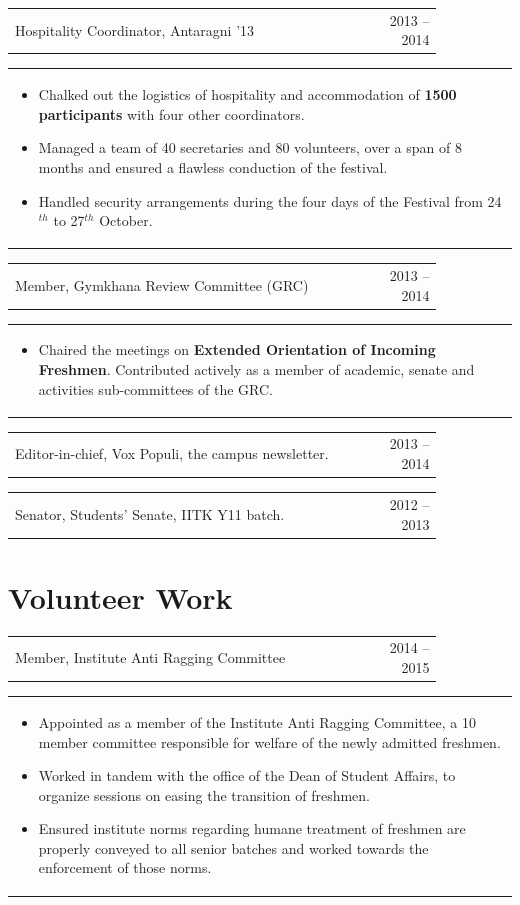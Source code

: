 \documentclass[a4paper]{article} %
\newcommand{\iproject}[3]{
    \begin{tabular}{p{0.85\linewidth}r}
        \textcolor{NavyBlue}{\small #2} & \multicolumn{1}{m{3cm}}{\raggedleft \small {\textsc{#1}}}\\
    \end{tabular}
    \begin{tabular}{p{\linewidth}}
    \vspace{-0.3cm}
        \footnotesize{#3}
    \end{tabular}
    \vspace{-0.6cm}
}
\newcommand{\skill}[2]{
    \begin{tabular}{p{0.85\linewidth}r}
        \small {#2} & \multicolumn{1}{m{3cm}}{\raggedleft \textsc{\small #1}}\\
    \end{tabular}
    \vspace{-0.5cm}
}
\begin{document}
\iproject {2013 -- 2014}
          {Hospitality Coordinator, Antaragni '13}
          {
               \begin{itemize}[leftmargin=0.5cm]
                   \item Chalked out the logistics of hospitality and accommodation of \textbf{1500 participants}
                       with four other coordinators.
                   \item Managed a team of 40 secretaries and 80 volunteers, over a span of 8 months and ensured a
                       flawless conduction of the festival.
                   \item Handled security arrangements during the four days of the Festival from 24$^{th}$ to 27$^{th}$ October.
               \end{itemize}
          }

\iproject {2013 -- 2014}
          {Member, Gymkhana Review Committee (GRC)}
          {
               \begin{itemize}[leftmargin=0.5cm]
                   \item Chaired the meetings on \textbf{Extended Orientation of Incoming Freshmen}.
                       Contributed actively as a member of academic, senate and activities sub-committees of the GRC.
               \end{itemize}
          }

\skill {2013 -- 2014}
       {Editor-in-chief, Vox Populi, the campus newsletter.}

\skill {2012 -- 2013}
       {Senator, Students' Senate, IITK Y11 batch.}


\section{Volunteer Work}

\iproject {2014 -- 2015}
          {Member, Institute Anti Ragging Committee}
          {
               \begin{itemize}[leftmargin=0.5cm]
                   \item Appointed as a member of the Institute Anti Ragging Committee, a 10 member committee responsible
                       for welfare of the newly admitted freshmen.
                   \item Worked in tandem with the office of the Dean of Student Affairs, to organize sessions
                       on easing the transition of freshmen.
                   \item Ensured institute norms regarding humane treatment of freshmen are properly conveyed to all senior batches
                       and worked towards the enforcement of those norms.
               \end{itemize}
          }
\end{document}

